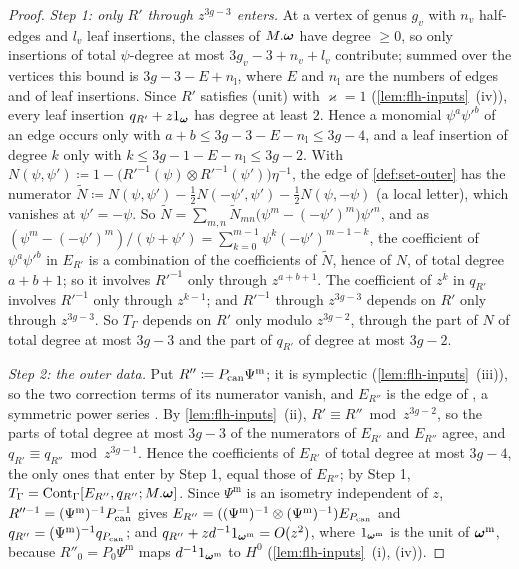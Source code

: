 \begin{proof}
\emph{Step 1: only $R'$ through $z^{3g-3}$ enters.} At a vertex of genus $g_v$ with $n_v$ half-edges and $l_v$ leaf insertions, the classes of $M.\boldsymbol{\omega}$ have degree $\geq0$, so only insertions of total $\psi$-degree at most $3g_v-3+n_v+l_v$ contribute; summed over the vertices this bound is $3g-3-E+n_{\mathrm l}$, where $E$ and $n_{\mathrm l}$ are the numbers of edges and of leaf insertions. Since $R'$ satisfies (unit) with $\varkappa=1$ (\cref{lem:flh-inputs}~(iv)), every leaf insertion $q_{R'}+z1_{\boldsymbol{\omega}}$ has degree at least $2$. Hence a monomial $\psi^a\psi'^b$ of an edge occurs only with $a+b\leq 3g-3-E-n_{\mathrm l}\leq 3g-4$, and a leaf insertion of degree $k$ only with $k\leq 3g-1-E-n_{\mathrm l}\leq 3g-2$. With $N(\psi,\psi')\coloneqq1-\bigl(R'^{-1}(\psi)\otimes R'^{-1}(\psi')\bigr)\eta^{-1}$, the edge of \cref{def:set-outer} has the numerator $\tilde N\coloneqq N(\psi,\psi')-\frac12N(-\psi',\psi')-\frac12N(\psi,-\psi)$ (a local letter), which vanishes at $\psi'=-\psi$. So $\tilde N=\sum_{m,n}\tilde N_{mn}\bigl(\psi^m-(-\psi')^m\bigr)\psi'^n$, and as $(\psi^m-(-\psi')^m)/(\psi+\psi')=\sum_{k=0}^{m-1}\psi^k(-\psi')^{m-1-k}$, the coefficient of $\psi^a\psi'^b$ in $E_{R'}$ is a combination of the coefficients of $\tilde N$, hence of $N$, of total degree $a+b+1$; so it involves $R'^{-1}$ only through $z^{a+b+1}$. The coefficient of $z^k$ in $q_{R'}$ involves $R'^{-1}$ only through $z^{k-1}$; and $R'^{-1}$ through $z^{3g-3}$ depends on $R'$ only through $z^{3g-3}$. So $T_\Gamma$ depends on $R'$ only modulo $z^{3g-2}$, through the part of $N$ of total degree at most $3g-3$ and the part of $q_{R'}$ of degree at most $3g-2$.

\emph{Step 2: the outer data.} Put $R''\coloneqq P_{\mathrm{can}}\Psi^{\mathrm m}$; it is symplectic (\cref{lem:flh-inputs}~(iii)), so the two correction terms of its numerator vanish, and $E_{R''}$ is the edge of \cite[Def.~2.2]{PPZ15}, a symmetric power series \cite[Rem.~2.1 and (6)]{PPZ15}. By \cref{lem:flh-inputs}~(ii), $R'\equiv R''\bmod z^{3g-2}$, so the parts of total degree at most $3g-3$ of the numerators of $E_{R'}$ and $E_{R''}$ agree, and $q_{R'}\equiv q_{R''}\bmod z^{3g-1}$. Hence the coefficients of $E_{R'}$ of total degree at most $3g-4$, the only ones that enter by Step 1, equal those of $E_{R''}$; by Step 1, $T_\Gamma=\mathrm{Cont}_\Gamma[E_{R''},q_{R''};M.\boldsymbol{\omega}]$. Since $\Psi^{\mathrm m}$ is an isometry independent of $z$, $R''^{-1}=(\Psi^{\mathrm m})^{-1}P_{\mathrm{can}}^{-1}$ gives $E_{R''}=((\Psi^{\mathrm m})^{-1}\otimes(\Psi^{\mathrm m})^{-1})E_{P_{\mathrm{can}}}$ and $q_{R''}=(\Psi^{\mathrm m})^{-1}q_{P_{\mathrm{can}}}$; and $q_{R''}+zd^{-1}1_{\boldsymbol{\omega}^{\mathrm m}}=O(z^2)$, where $1_{\boldsymbol{\omega}^{\mathrm m}}$ is the unit of $\boldsymbol{\omega}^{\mathrm m}$, because $R''_0=P_0\Psi^{\mathrm m}$ maps $d^{-1}1_{\boldsymbol{\omega}^{\mathrm m}}$ to $H^0$ (\cref{lem:flh-inputs}~(i), (iv)).


\end{proof}
